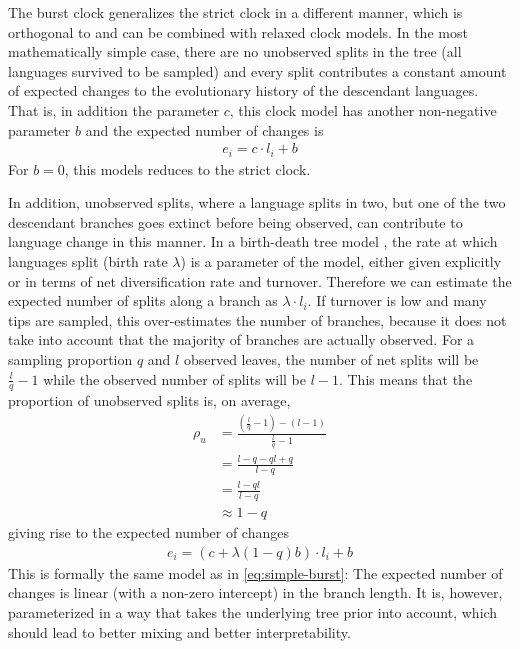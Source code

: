 \documentclass[a4paper,12pt]{scrartcl}
\begin{document}
The burst clock generalizes the strict clock in a different manner, which is
orthogonal to and can be combined with relaxed clock models.
In the most mathematically simple case, there are no unobserved splits in
the tree (all languages survived to be sampled) and every split contributes a
constant amount of expected changes to the evolutionary history of the
descendant languages. That is, in addition the parameter $c$, this clock model
has another non-negative parameter $b$ and the expected number of changes is
\begin{align}
  e_i = c \cdot l_i + b
  \label{eq:simple-burst}
\end{align}
For $b=0$, this models reduces to the strict clock.

%

In addition, unobserved splits, where a language splits in two, but one of
the two descendant branches goes extinct before being observed, can contribute
to language change in this manner.
In a birth-death tree model \parencite{gernhard2008conditioned,stadler2010samlingthroughtime,heath2014fossilized}, the rate at which
languages split (birth rate $\lambda$) is a parameter of the model, either given explicitly or in terms of net diversification rate and turnover. Therefore
we can estimate the expected number of splits along a branch as $\lambda \cdot
l_i$. If turnover is low and many tips are sampled, this over-estimates the number of branches, because it does not take into account that the majority of branches are actually observed. For a sampling proportion $q$ and $l$ observed leaves, the number of net splits will be
$\frac{l}{q} - 1$
while the observed number of splits will be $l - 1$. This means that the proportion of unobserved splits is, on average,
\begin{align}
    \rho_u &= \frac{(\frac{l}{q} - 1) - (l - 1)}{\frac{l}{q} -1} \\
    & = \frac{l - q - ql + q}{l - q} \\
    & = \frac{l - ql}{l - q} \\
    & \approx 1 - q
\end{align}
giving rise to the expected number of changes
\begin{align}
  e_i = (c + \lambda (1-q) b) \cdot l_i + b
  \label{eq:reparam-burst}
\end{align}
This is formally the same model as in \cref{eq:simple-burst}: The expected number of changes is linear (with a non-zero intercept) in the branch length. It is, however, parameterized
in a way that takes the underlying tree prior into account,
which should lead to better mixing and better interpretability.
\end{document}
